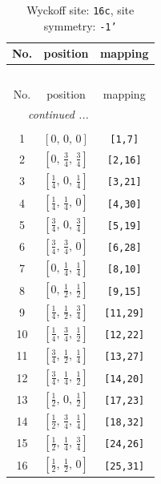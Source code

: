 \documentclass[fleqn,8pt]{jsarticle}
\begin{document}
\begin{longtable}{ccc}
\caption{Wyckoff site: {\tt 16c}, site symmetry: {\tt -1'}}
 \\
 \hline \hline
No. & position & mapping \\ \hline \endfirsthead

\multicolumn{2}{l}{\tablename\ \thetable{}} \\
 \hline \hline
No. & position & mapping \\ \hline \endhead

 \hline \hline
\multicolumn{2}{r}{\footnotesize\it continued ...} \\ \endfoot

 \hline \hline
\multicolumn{2}{r}{} \\ \endlastfoot

1 & $\left[ 0,\, 0,\, 0 \right]$ & {\tt [1,7]} \\ \hline
2 & $\left[ 0,\, \frac{3}{4},\, \frac{3}{4} \right]$ & {\tt [2,16]} \\ \hline
3 & $\left[ \frac{1}{4},\, 0,\, \frac{1}{4} \right]$ & {\tt [3,21]} \\ \hline
4 & $\left[ \frac{1}{4},\, \frac{1}{4},\, 0 \right]$ & {\tt [4,30]} \\ \hline
5 & $\left[ \frac{3}{4},\, 0,\, \frac{3}{4} \right]$ & {\tt [5,19]} \\ \hline
6 & $\left[ \frac{3}{4},\, \frac{3}{4},\, 0 \right]$ & {\tt [6,28]} \\ \hline
7 & $\left[ 0,\, \frac{1}{4},\, \frac{1}{4} \right]$ & {\tt [8,10]} \\ \hline
8 & $\left[ 0,\, \frac{1}{2},\, \frac{1}{2} \right]$ & {\tt [9,15]} \\ \hline
9 & $\left[ \frac{1}{4},\, \frac{1}{2},\, \frac{3}{4} \right]$ & {\tt [11,29]} \\ \hline
10 & $\left[ \frac{1}{4},\, \frac{3}{4},\, \frac{1}{2} \right]$ & {\tt [12,22]} \\ \hline
11 & $\left[ \frac{3}{4},\, \frac{1}{2},\, \frac{1}{4} \right]$ & {\tt [13,27]} \\ \hline
12 & $\left[ \frac{3}{4},\, \frac{1}{4},\, \frac{1}{2} \right]$ & {\tt [14,20]} \\ \hline
13 & $\left[ \frac{1}{2},\, 0,\, \frac{1}{2} \right]$ & {\tt [17,23]} \\ \hline
14 & $\left[ \frac{1}{2},\, \frac{3}{4},\, \frac{1}{4} \right]$ & {\tt [18,32]} \\ \hline
15 & $\left[ \frac{1}{2},\, \frac{1}{4},\, \frac{3}{4} \right]$ & {\tt [24,26]} \\ \hline
16 & $\left[ \frac{1}{2},\, \frac{1}{2},\, 0 \right]$ & {\tt [25,31]} \\
\end{longtable}
\end{document}
